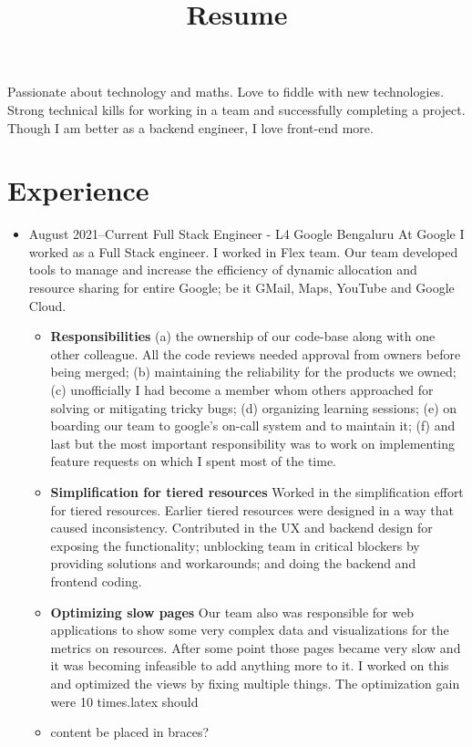 \documentclass[11pt,a4paper,sans]{moderncv}
\title{Resume}
\begin{document}
\makecvtitle
\small
Passionate about technology and maths. Love to fiddle with new technologies. Strong technical kills for working in a team and successfully completing a project. Though I am better as a backend engineer, I love front-end more.
\section{Experience}
\vspace{6pt}
\begin{itemize}
  \item
    \cventry
    {August 2021--Current}
    {Full Stack Engineer - L4}
    {Google}
    {Bengaluru}
    {}
    {}
    \vspace {5pt}
    At Google I worked as a Full Stack engineer. I worked in Flex team. Our team developed tools to manage and increase the efficiency of dynamic allocation and resource sharing for entire Google; be it GMail, Maps, YouTube and Google Cloud.
    \vspace {2pt}
    \begin {itemize}
      \item
        \textbf {Responsibilities}
        (a) the ownership of our code-base along with one other colleague. All the code reviews needed approval from owners before being merged; (b) maintaining the reliability for the products we owned; (c) unofficially I had become a member whom others approached for solving or mitigating tricky bugs; (d) organizing learning sessions; (e) on boarding our team to google's on-call system and to maintain it; (f) and last but the most important responsibility was to work on implementing feature requests on which I spent most of the time.
      \vspace {2pt}
      \item
        \textbf {Simplification for tiered resources}
        Worked in the simplification effort for tiered resources. Earlier tiered resources were designed in a way that caused inconsistency. Contributed in the UX and backend design for exposing the functionality; unblocking team in critical blockers by providing solutions and workarounds; and doing the backend and frontend coding.
      \vspace {2pt}
      \item
        \textbf {Optimizing slow pages}
        Our team also was responsible for web applications to show some very complex data and visualizations for the metrics on resources. After some point those pages became very slow and it was becoming infeasible to add anything more to it. I worked on this and optimized the views by fixing multiple things. The optimization gain were 10 times.latex should \item content be placed in braces?

\end{itemize}
\end{itemize}
\end{document}
